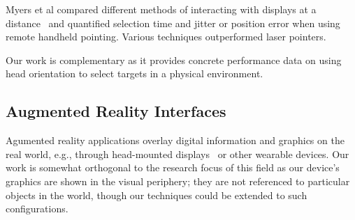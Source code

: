 Myers et al compared different methods of interacting with displays at a distance~\cite{myers_interacting_2002} and quantified selection time and jitter or position error when using remote handheld pointing. Various techniques outperformed laser pointers. 

Our work is complementary as it provides concrete performance data on using head orientation to select targets in a physical environment.


\subsection{Augmented Reality Interfaces}
Agumented reality applications overlay digital information and graphics on the real world, e.g., through head-mounted displays~\cite{azuma_recent_2001} or other wearable devices. 
Our work is somewhat orthogonal to the research focus of this field as our device's graphics are shown in the visual periphery; they are not referenced to particular objects in the world, though our techniques could be extended to such configurations.

